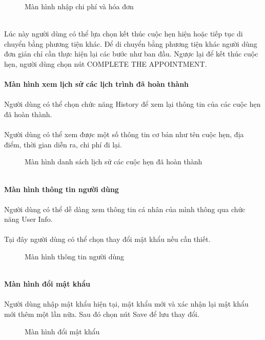 \documentclass[a4paper]{article}
\begin{document}
\begin{figure}[!h]
    \centering
    \caption{Màn hình nhập chi phí và hóa đơn}
    \label{fig:ui_employee_list}
\end{figure} 
\\
Lúc này người dùng có thể lựa chọn kết thúc cuộc hẹn hiện hoặc tiếp tục di chuyển bằng phương tiện khác. Để di chuyển bằng phương tiện khác người dùng đơn giản chỉ cần thực hiện lại các bước như ban đầu. Ngược lại để kết thúc cuộc hẹn, người dùng chọn nút COMPLETE THE APPOINTMENT.\\\\
\clearpage
\noindent
\textbf{Màn hình xem lịch sử các lịch trình đã hoàn thành}\\\\
Người dùng có thể chọn chức năng History để xem lại thông tin của các cuộc hẹn đã hoàn thành.\\\\
Người dùng có thể xem được một số thông tin cơ bản như tên cuộc hẹn, địa điểm, thời gian diễn ra, chi phí đi lại.\\
\begin{figure}[!h]
    \centering
    \caption{Màn hình danh sách lịch sử các cuộc hẹn đã hoàn thành}
    \label{fig:ui_employee_list}
\end{figure} 
\\
\textbf{Màn hình thông tin người dùng}\\\\
Người dùng có thể dễ dàng xem thông tin cá nhân của mình thông qua chức năng User Info.\\\\
Tại đây người dùng có thể chọn thay đổi mật khẩu nếu cần thiết.\\
\begin{figure}[!h]
    \centering
    \caption{Màn hình thông tin người dùng}
    \label{fig:ui_employee_list}
\end{figure} 
\\
\textbf{Màn hình đổi mật khẩu}\\\\
Người dùng nhập mật khẩu hiện tại, mật khẩu mới và xác nhận lại mật khẩu mới thêm một lần nữa.  Sau đó chọn nút Save để lưu thay đổi.\\
\begin{figure}[!h]
    \centering
    \caption{Màn hình đổi mật khẩu}
    \label{fig:ui_employee_list}
\end{figure} 
\end{document}
